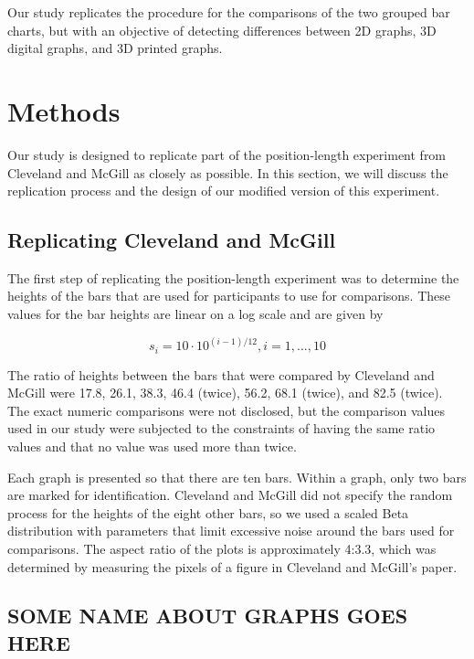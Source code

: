 \documentclass[letterpaper,inpress]{jdsart}
\begin{document}
Our study replicates the procedure for the comparisons of the two grouped bar charts, but with an objective of detecting differences between 2D graphs, 3D digital graphs, and 3D printed graphs.

\hypertarget{methods}{%
\section{Methods}\label{methods}}

Our study is designed to replicate part of the position-length experiment from Cleveland and McGill as closely as possible.
In this section, we will discuss the replication process and the design of our modified version of this experiment.

\hypertarget{replicating-cleveland-and-mcgill}{%
\subsection{Replicating Cleveland and McGill}\label{replicating-cleveland-and-mcgill}}

The first step of replicating the position-length experiment was to determine the heights of the bars that are used for participants to use for comparisons.
These values for the bar heights are linear on a log scale and are given by

\[s_i=10\cdot 10^{(i-1)/12}, i=1,...,10\]

The ratio of heights between the bars that were compared by Cleveland and McGill were 17.8, 26.1, 38.3, 46.4 (twice), 56.2, 68.1 (twice), and 82.5 (twice).
The exact numeric comparisons were not disclosed, but the comparison values used in our study were subjected to the constraints of having the same ratio values and that no value was used more than twice.

Each graph is presented so that there are ten bars.
Within a graph, only two bars are marked for identification.
Cleveland and McGill did not specify the random process for the heights of the eight other bars, so we used a scaled Beta distribution with parameters that limit excessive noise around the bars used for comparisons.
The aspect ratio of the plots is approximately 4:3.3, which was determined by measuring the pixels of a figure in Cleveland and McGill's paper.

\hypertarget{some-name-about-graphs-goes-here}{%
\subsection{SOME NAME ABOUT GRAPHS GOES HERE}\label{some-name-about-graphs-goes-here}}
\end{document}
